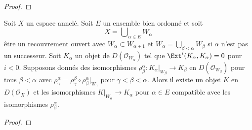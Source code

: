 {\begin{proof}
\end{proof}

\begin{lemma}

\label{lemma-glueing-increasing-union}

Soit $X$ un espace annelé. Soit $E$ un ensemble bien ordonné et soit
$$
X = \bigcup\nolimits_{\alpha \in E} W_\alpha
$$
être un recouvrement ouvert avec $W_\alpha \subset W_{\alpha + 1}$
et $W_\alpha = \bigcup_{\beta < \alpha} W_\beta$ si $\alpha$ n'est pas un successeur. Soit $K_\alpha$ un objet de $D(\mathcal{O}_{W_\alpha})$
tel que $\Ext^i(K_\alpha, K_\alpha) = 0$ pour $i < 0$. Supposons donnés des isomorphismes
$\rho_\beta^\alpha :  K_\alpha|_{W_\beta} \to K_\beta$ en
$D(\mathcal{O}_{W_\beta})$ pour tous $\beta < \alpha$ avec
$\rho_\gamma^\alpha = \rho_\gamma^\beta \circ \rho^\alpha_\beta|_{W_\gamma}$
pour $\gamma < \beta < \alpha$. Alors il existe un objet
$K$ en $D(\mathcal{O}_X)$ et les isomorphismes
$K|_{W_\alpha} \to K_\alpha$ pour $\alpha \in E$
compatible avec les isomorphismes $\rho_\beta^\alpha$.

\end{lemma}

\begin{proof}


\end{proof}}

